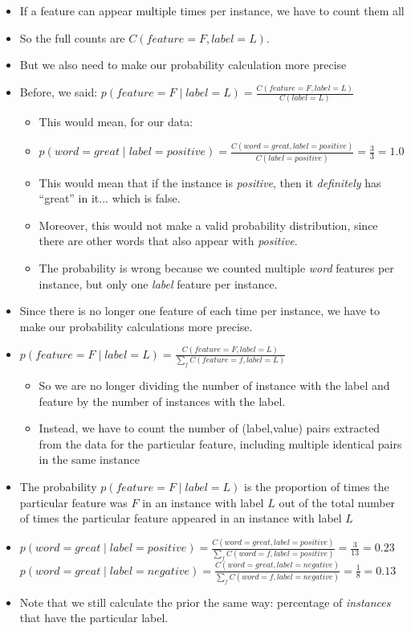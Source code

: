 \documentclass[11pt,letterpaper]{article}
\begin{document}
\begin{itemize}
  \item If a feature can appear multiple times per instance, we have to count them all
  \item So the full counts are $C(feature=F,label=L)$.
  \item But we also need to make our probability calculation more precise
  \item Before, we said: $p(feature=F \mid label=L) = \frac{C(feature=F,label=L)}{C(label=L)}$
    \begin{itemize}
      \item This would mean, for our data:
      \item $p(word=great \mid label=positive) = \frac{C(word=great, label=positive)}{C(label=positive)} = \frac{3}{3} = 1.0$
      \item This would mean that if the instance is \textit{positive}, then it \textit{definitely} has ``great'' in it... which is false.
      \item Moreover, this would not make a valid probability distribution, since there are other words that also appear with \textit{positive}.
      \item The probability is wrong because we counted multiple \textit{word} features per instance, but only one \textit{label} feature per instance.
    \end{itemize}
  \item Since there is no longer one feature of each time per instance, we have to make our probability calculations more precise.
  \item $p(feature=F \mid label=L) = \frac{C(feature=F,label=L)}{\sum_f C(feature=f,label=L)}$
    \begin{itemize}
      \item So we are no longer dividing the number of instance with the label and feature by the number of instances with the label.
      \item Instead, we have to count the number of (label,value) pairs extracted from the data for the particular feature, including multiple identical pairs in the same instance
    \end{itemize}
  \item The probability $p(feature=F \mid label=L)$ is the proportion of times the particular feature was $F$ in an instance with label $L$ out of the total number of times the particular feature appeared in an instance with label $L$
  \item $p(word=great \mid label=positive) = \frac{C(word=great,label=positive)}{\sum_f C(word=f,label=positive)} = \frac{3}{13} = 0.23$ \\
  $p(word=great \mid label=negative) = \frac{C(word=great,label=negative)}{\sum_f C(word=f,label=negative)} = \frac{1}{8} = 0.13$
  \item Note that we still calculate the prior the same way: percentage of \textit{instances} that have the particular label.
\end{itemize}
\end{document}
